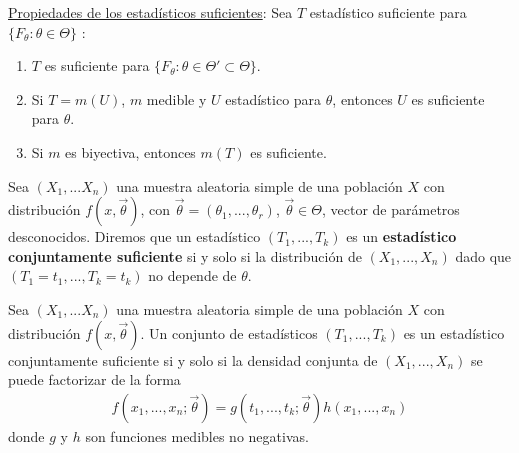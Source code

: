 \underline{Propiedades de los estadísticos suficientes}:
Sea $T$ estadístico suficiente para $\{F_{\theta} : \theta \in \Theta\}$ :
\begin{enumerate}
    \item $T$ es suficiente para $\{F_{\theta} : \theta \in \Theta' \subset \Theta\}$.
    \item Si $T = m(U)$, $m$ medible y $U$ estadístico para $\theta$, entonces $U$ es suficiente para $\theta$.
    \item Si $m$ es biyectiva, entonces $m(T)$ es suficiente.
\end{enumerate}

\begin{defi}
Sea $(X_1,...X_n)$ una muestra aleatoria simple de una población $X$ con distribución $f(x,\overrightarrow{\theta})$, con $\overrightarrow{\theta} = (\theta_1,...,\theta_r)$, $\overrightarrow{\theta} \in \Theta$, vector de parámetros desconocidos. Diremos que un estadístico $(T_1,...,T_k)$ es un \textbf{estadístico conjuntamente suficiente} si y solo si la distribución de $(X_1,...,X_n)$ dado que $(T_1 = t_1, ..., T_k = t_k)$ no depende de $\theta$.
\end{defi}

\begin{teo}
Sea $(X_1,...X_n)$ una muestra aleatoria simple de una población $X$ con distribución $f(x,\overrightarrow{\theta})$. Un conjunto de estadísticos $(T_1,...,T_k)$ es un estadístico conjuntamente suficiente si y solo si la densidad conjunta de $(X_1,...,X_n)$ se puede factorizar de la forma
\begin{align*}
    f(x_1,...,x_n;\overrightarrow{\theta}) = g(t_1,...,t_k;\overrightarrow{\theta})h(x_1,...,x_n)
\end{align*}
donde $g$ y $h$ son funciones medibles no negativas.
\end{teo}

